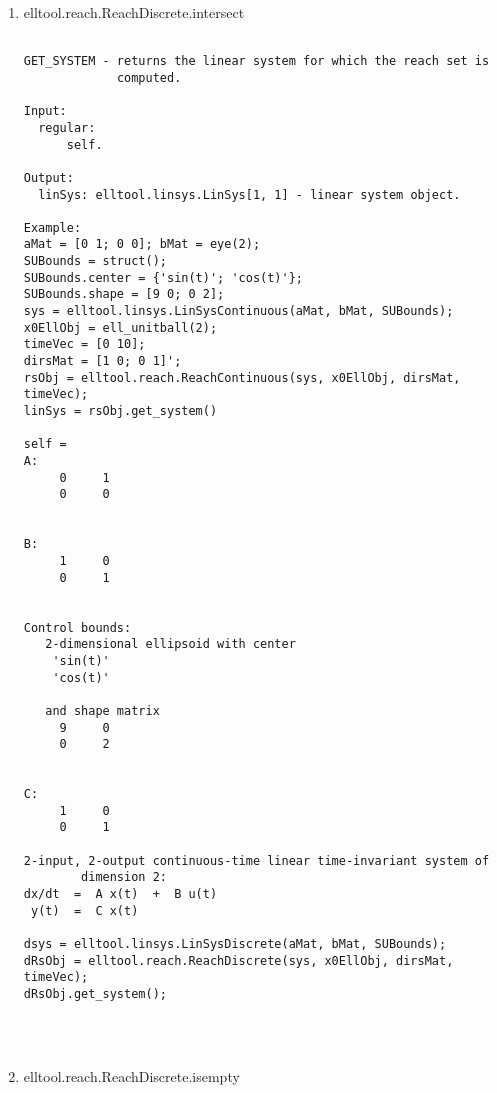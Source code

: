 \begin{enumerate}
\begin{lstlisting}
    As "Properties" we understand here such list of ellipsoid
    properties:
        absTol
        relTol
        nPlot2dPoints
        nPlot3dPoints
        nTimeGridPoints

Output:
    self - reach set object.

Example:
adMat = [0 1; -1 -0.5];
bdMat = [0; 1];
udBoundsEllObj  = ellipsoid(1);
dtsys = elltool.linsys.LinSysDiscrete(adMat, bdMat, udBoundsEllObj);
x0EllObj = ell_unitball(2);
timeVec = [0 10];
dirsMat = [1 0; 0 1]';
dRsObj = elltool.reach.ReachDiscrete(dtsys, x0EllObj, dirsMat, timeVec);



\end{lstlisting}
\fontfamily{\familydefault}
\selectfont
\item {elltool.reach.ReachDiscrete.intersect}
\selectfont
\begin{lstlisting}

GET_SYSTEM - returns the linear system for which the reach set is
             computed.

Input:
  regular:
      self.

Output:
  linSys: elltool.linsys.LinSys[1, 1] - linear system object.

Example:
aMat = [0 1; 0 0]; bMat = eye(2);
SUBounds = struct();
SUBounds.center = {'sin(t)'; 'cos(t)'};
SUBounds.shape = [9 0; 0 2];
sys = elltool.linsys.LinSysContinuous(aMat, bMat, SUBounds);
x0EllObj = ell_unitball(2);
timeVec = [0 10];
dirsMat = [1 0; 0 1]';
rsObj = elltool.reach.ReachContinuous(sys, x0EllObj, dirsMat, timeVec);
linSys = rsObj.get_system()

self =
A:
     0     1
     0     0


B:
     1     0
     0     1


Control bounds:
   2-dimensional ellipsoid with center
    'sin(t)'
    'cos(t)'

   and shape matrix
     9     0
     0     2


C:
     1     0
     0     1

2-input, 2-output continuous-time linear time-invariant system of
        dimension 2:
dx/dt  =  A x(t)  +  B u(t)
 y(t)  =  C x(t)

dsys = elltool.linsys.LinSysDiscrete(aMat, bMat, SUBounds);
dRsObj = elltool.reach.ReachDiscrete(sys, x0EllObj, dirsMat, timeVec);
dRsObj.get_system();




\end{lstlisting}
\fontfamily{\familydefault}
\selectfont
\item {elltool.reach.ReachDiscrete.isempty}
\selectfont
\begin{lstlisting}


\end{lstlisting}
\end{enumerate}
